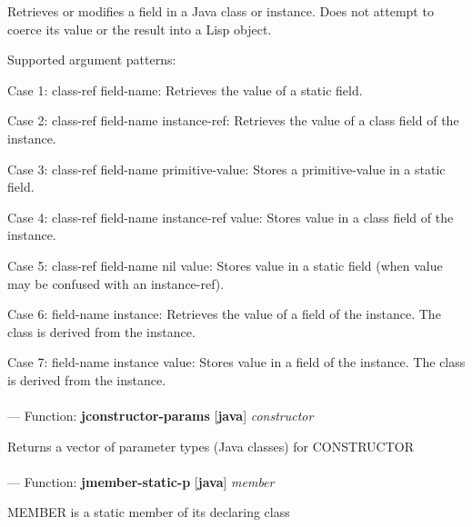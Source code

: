 \begin{adjustwidth}{5em}{5em}
Retrieves or modifies a field in a Java class or instance. Does not
attempt to coerce its value or the result into a Lisp object.

Supported argument patterns:

   Case 1: class-ref  field-name:
      Retrieves the value of a static field.

   Case 2: class-ref  field-name  instance-ref:
      Retrieves the value of a class field of the instance.

   Case 3: class-ref  field-name  primitive-value:
      Stores a primitive-value in a static field.

   Case 4: class-ref  field-name  instance-ref  value:
      Stores value in a class field of the instance.

   Case 5: class-ref  field-name  nil  value:
      Stores value in a static field (when value may be
      confused with an instance-ref).

   Case 6: field-name  instance:
      Retrieves the value of a field of the instance. The
      class is derived from the instance.

   Case 7: field-name  instance  value:
      Stores value in a field of the instance. The class is
      derived from the instance.


\end{adjustwidth}

\paragraph{}
\label{JAVA:JCONSTRUCTOR-PARAMS}
--- Function: \textbf{jconstructor-params} [\textbf{java}] \textit{constructor}

\begin{adjustwidth}{5em}{5em}
Returns a vector of parameter types (Java classes) for CONSTRUCTOR
\end{adjustwidth}

\paragraph{}
\label{JAVA:JMEMBER-STATIC-P}
--- Function: \textbf{jmember-static-p} [\textbf{java}] \textit{member}

\begin{adjustwidth}{5em}{5em}
MEMBER is a static member of its declaring class
\end{adjustwidth}

